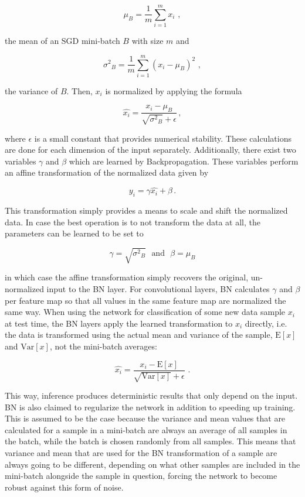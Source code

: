 \[ \mu_B = \frac{1}{m} \sum \limits_{i=1}^{m} x_i\,\,, \]

\noindent the mean of an SGD mini-batch $B$ with size $m$ and

\[ {\sigma^2}_B = \frac{1}{m} \sum \limits_{i=1}^{m} \left ( x_i - \mu_B \right )^2 \,\,, \]

\noindent the variance of $B$. Then, $x_i$ is normalized by applying the formula

\[  \hat{x_i} = \frac{x_i - \mu_B}{\sqrt{{\sigma^2}_B} + \epsilon} \,, \]

\noindent where $\epsilon$ is a small constant that provides numerical stability. These calculations are done for each dimension of the input separately. Additionally, there exist two variables $\gamma$ and $\beta$ which are learned by Backpropagation. These variables perform an affine transformation of the normalized data given by

\[ y_i = \gamma \hat{x_i} + \beta \,. \]

\noindent This transformation simply provides a means to scale and shift the normalized data. In case the best operation is to not transform the data at all, the parameters can be learned to be set to 

\[ \gamma = \sqrt{{\sigma^2}_B} \,\,\text{ and } \,\, \beta = \mu_B \]

\noindent in which case the affine transformation simply recovers the original, un\--norm\-a\-lized input to the BN layer. For convolutional layers, BN calculates $\gamma$ and $\beta$ per feature map so that all values in the same feature map are normalized the same way. When using the network for classification of some new data sample $x_i$ at test time, the BN layers apply the learned transformation to $x_i$ directly, i.e. the data is transformed using the actual mean and variance of the sample, $\text{E}[x]$ and $\text{Var}[x]$, not the mini-batch averages:

\[  \hat{x_i} = \frac{x_i - \text{E}[x]}{\sqrt{\text{Var}[x]} + \epsilon}\,\,  . \]

\noindent This way, inference produces deterministic results that only depend on the input.\\

\noindent BN is also claimed to regularize the network in addition to speeding up training. This is assumed to be the case because the variance and mean values that are calculated for a sample in a mini-batch are always an average of all samples in the batch, while the batch is chosen randomly from all samples. This means that variance and mean that are used for the BN transformation of a sample are always going to be different, depending on what other samples are included in the mini-batch alongside the sample in question, forcing the network to become robust against this form of noise.
